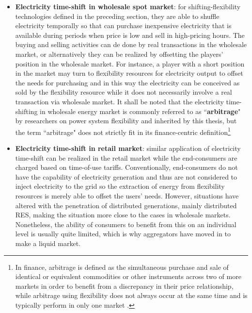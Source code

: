 \begin{itemize}
	\item \textbf{Electricity time-shift in wholesale spot market}: for shifting-flexibility technologies defined in the preceding section, they are able to shuffle electricity temporally so that can purchase inexpensive electricity that is available during periods when price is low and sell in high-pricing hours. The buying and selling activities can de done by real transactions in the wholesale market, or alternatively they can be realized by offsetting the players' position in the wholesale market. For instance, a player with a short position in the market may turn to flexibility resources for electricity output to offset the needs for purchasing and in this way the electricity can be conceived as sold by the flexibility resource while it does not necessarily involve a real transaction via wholesale market. It shall be noted that the electricity time-shifting in wholesale energy market is commonly referred to as ``\textbf{arbitrage}" by researchers on power system flexibility \cite{Walawalkar2007,Sioshansi2009,Connolly2011,Byrne2012,Bradbury2014,McConnell2015,Berrada2016,Zafirakis2016,Salles2017} and inherited by this thesis, but the term ``arbitrage" does not strictly fit in its finance-centric definition\footnote{In finance, arbitrage is defined as the simultaneous purchase and sale of identical or equivalent commodities or other instruments across two of more markets in order to benefit from a discrepancy in their price relationship, while arbitrage using flexibility does not always occur at the same time and is typically perform in only one market \cite{Eyer2010}.}
	
	\item \textbf{Electricity time-shift in retail market}: similar application of electricity time-shift can be realized in the retail market while the end-consumers are charged based on time-of-use tariffs. Conventionally, end-consumers do not have the capability of electricity generation and thus are not considered to inject electricity to the grid so the extraction of energy from flexibility resources is merely able to offset the users' needs. However, situations have altered with the penetration of distributed generations, mainly distributed RES, making the situation more close to the cases in wholesale markets. Nonetheless, the ability of consumers to benefit from this on an individual level is usually quite limited, which is why aggregators have moved in to make a liquid market.
	

\end{itemize}
